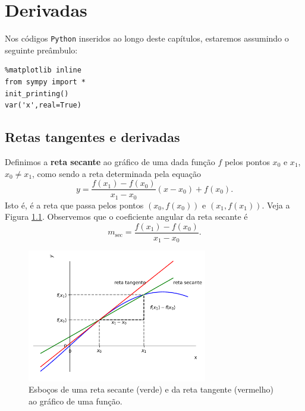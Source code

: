 
\chapter{Derivadas}\label{cap_deriv}
\thispagestyle{fancy}

\ifispython
\begin{obs}\label{obs:deriv_python}
  Nos códigos \verb+Python+ inseridos ao longo deste capítulos, estaremos assumindo o seguinte preâmbulo:
\begin{verbatim}
%matplotlib inline
from sympy import *
init_printing()
var('x',real=True)
\end{verbatim}
\end{obs}
\fi

\section{Retas tangentes e derivadas}\label{cap_deriv_sec_retg}

Definimos a {\bf reta secante} ao gráfico de uma dada função $f$ pelos pontos $x_0$ e $x_1$, $x_0\neq x_1$, como sendo a reta determinada pela equação
\begin{equation}
  y = \frac{f(x_1)-f(x_0)}{x_1-x_0}(x-x_0)+f(x_0).
\end{equation}
Isto é, é a reta que passa pelos pontos $(x_0,f(x_0))$ e $(x_1,f(x_1))$. Veja a Figura \ref{fig:retsectg}. Observemos que o coeficiente angular da reta secante é
\begin{equation}
  m_{\text{sec}} = \frac{f(x_1)-f(x_0)}{x_1-x_0}.
\end{equation}

\begin{figure}[H]
  \centering
  \includegraphics[width=0.7\textwidth]{./cap_deriv/dados/fig_retsectg/fig_retsectg}
  \caption{Esboços de uma reta secante (verde) e da reta tangente (vermelho) ao gráfico de uma função.}
  \label{fig:retsectg}
\end{figure}


